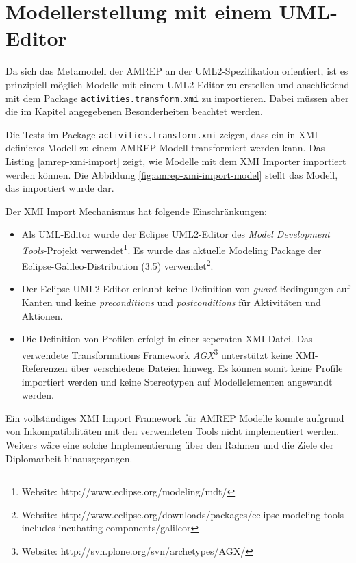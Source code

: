 \section{Modellerstellung mit einem UML-Editor}\label{amrep-use-umleditor}
Da sich das Metamodell der AMREP an der UML2-Spezifikation orientiert, ist es prinzipiell möglich Modelle mit einem UML2-Editor zu erstellen und anschließend mit dem Package \texttt{activities.transform.xmi} zu importieren. Dabei müssen aber die im Kapitel  angegebenen Besonderheiten beachtet werden.

Die Tests im Package \texttt{activities.transform.xmi} zeigen, dass ein in XMI definieres Modell zu einem AMREP-Modell transformiert werden kann. Das Listing \ref{amrep-xmi-import} zeigt, wie Modelle mit dem XMI Importer importiert werden können. Die Abbildung \ref{fig:amrep-xmi-import-model} stellt das Modell, das importiert wurde dar.

Der XMI Import Mechanismus hat folgende Einschränkungen:
\begin{itemize}
\item Als UML-Editor wurde der Eclipse UML2-Editor des \emph{Model Development Tools}-Projekt verwendet\footnote
{Website: http://www.eclipse.org/modeling/mdt/}.
Es wurde das aktuelle Modeling Package der Eclipse-Galileo-Distribution (3.5) verwendet\footnote
{Website: http://www.eclipse.org/downloads/packages/eclipse-modeling-tools-includes-incubating-components/galileor}.
\item Der Eclipse UML2-Editor erlaubt keine Definition von \emph{guard}-Bedingungen auf Kanten und keine \emph{preconditions} und \emph{postconditions} für Aktivitäten und Aktionen. %
\item Die Definition von Profilen erfolgt in einer seperaten XMI Datei. Das verwendete Transformations Framework \emph{AGX}\footnote
{Website: http://svn.plone.org/svn/archetypes/AGX/}
unterstützt keine XMI-Referenzen über verschiedene Dateien hinweg. Es können somit keine Profile importiert werden und keine Stereotypen auf Modellelementen angewandt werden.
\end{itemize}



Ein vollständiges XMI Import Framework für AMREP Modelle konnte aufgrund von Inkompatibilitäten mit den verwendeten Tools nicht implementiert werden. Weiters wäre eine solche Implementierung über den Rahmen und die Ziele der Diplomarbeit hinausgegangen.


